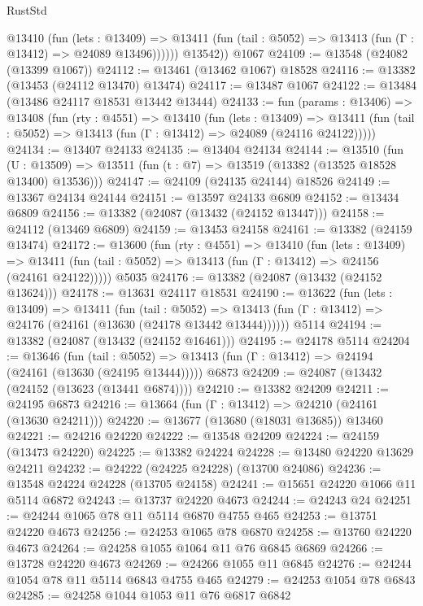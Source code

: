 \begin{lexlean}{RustStd}
\begin{coremodule}
            @13410
              (fun (lets : @13409) =>
              @13411 (fun (tail : @5052) => @13413 (fun (Γ : @13412) => @24089 @13496))))))
        @13542))
    @1067
@24109 := @13548 (@24082 (@13399 @1067))
@24112 := @13461 (@13462 @1067) @18528
@24116 := @13382 (@13453 (@24112 @13470) @13474)
@24117 := @13487 @1067
@24122 := @13484 (@13486 @24117 @18531 @13442 @13444)
@24133 := fun (params : @13406) =>
  @13408
    (fun (rty : @4551) =>
    @13410
      (fun (lets : @13409) =>
      @13411 (fun (tail : @5052) => @13413 (fun (Γ : @13412) => @24089 (@24116 @24122)))))
@24134 := @13407 @24133
@24135 := @13404 @24134
@24144 := @13510
    (fun (U : @13509) => @13511 (fun (t : @7) => @13519 (@13382 (@13525 @18528 @13400) @13536)))
@24147 := @24109 (@24135 @24144) @18526
@24149 := @13367 @24134 @24144
@24151 := @13597 @24133 @6809
@24152 := @13434 @6809
@24156 := @13382 (@24087 (@13432 (@24152 @13447)))
@24158 := @24112 (@13469 @6809)
@24159 := @13453 @24158
@24161 := @13382 (@24159 @13474)
@24172 := @13600
    (fun (rty : @4551) =>
    @13410
      (fun (lets : @13409) =>
      @13411 (fun (tail : @5052) => @13413 (fun (Γ : @13412) => @24156 (@24161 @24122)))))
    @5035
@24176 := @13382 (@24087 (@13432 (@24152 @13624)))
@24178 := @13631 @24117 @18531
@24190 := @13622
    (fun (lets : @13409) =>
    @13411
      (fun (tail : @5052) =>
      @13413 (fun (Γ : @13412) => @24176 (@24161 (@13630 (@24178 @13442 @13444))))))
    @5114
@24194 := @13382 (@24087 (@13432 (@24152 @16461)))
@24195 := @24178 @5114
@24204 := @13646
    (fun (tail : @5052) => @13413 (fun (Γ : @13412) => @24194 (@24161 (@13630 (@24195 @13444)))))
    @6873
@24209 := @24087 (@13432 (@24152 (@13623 (@13441 @6874))))
@24210 := @13382 @24209
@24211 := @24195 @6873
@24216 := @13664 (fun (Γ : @13412) => @24210 (@24161 (@13630 @24211)))
@24220 := @13677 (@13680 (@18031 @13685)) @13460
@24221 := @24216 @24220
@24222 := @13548 @24209
@24224 := @24159 (@13473 @24220)
@24225 := @13382 @24224
@24228 := @13480 @24220 @13629 @24211
@24232 := @24222 (@24225 @24228) (@13700 @24086)
@24236 := @13548 @24224 @24228 (@13705 @24158)
@24241 := @15651 @24220 @1066 @11 @5114 @6872
@24243 := @13737 @24220 @4673
@24244 := @24243 @24
@24251 := @24244 @1065 @78 @11 @5114 @6870 @4755 @465
@24253 := @13751 @24220 @4673
@24256 := @24253 @1065 @78 @6870
@24258 := @13760 @24220 @4673
@24264 := @24258 @1055 @1064 @11 @76 @6845 @6869
@24266 := @13728 @24220 @4673
@24269 := @24266 @1055 @11 @6845
@24276 := @24244 @1054 @78 @11 @5114 @6843 @4755 @465
@24279 := @24253 @1054 @78 @6843
@24285 := @24258 @1044 @1053 @11 @76 @6817 @6842

\end{coremodule}
\end{lexlean}

